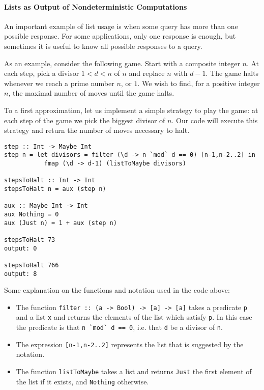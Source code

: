 \documentclass[11pt]{article}
\theoremstyle{nonumberplain}
\newcommand*\lsin{\lstinline}
\begin{document}
\paragraph{Lists as Output of Nondeterministic Computations}

An important example of list usage is when some query has more than one possible response. For some applications, only one response is enough, but sometimes it is useful to know all possible responses to a query.

As an example, consider the following game. Start with a composite integer $n$. At each step, pick a divisor $1 < d < n$ of $n$ and replace $n$ with $d-1$. The game halts whenever we reach a prime number $n$, or $1$. We wish to find, for a positive integer $n$, the maximal number of moves until the game halts.

To a first approximation, let us implement a simple strategy to play the game: at each step of the game we pick the biggest divisor of $n$. Our code will execute this strategy and return the number of moves necessary to halt.
\begin{lstlisting}
step :: Int -> Maybe Int
step n = let divisors = filter (\d -> n `mod` d == 0) [n-1,n-2..2] in
           fmap (\d -> d-1) (listToMaybe divisors)

stepsToHalt :: Int -> Int
stepsToHalt n = aux (step n)

aux :: Maybe Int -> Int
aux Nothing = 0
aux (Just n) = 1 + aux (step n)

stepsToHalt 73
output: 0

stepsToHalt 766
output: 8
\end{lstlisting}

Some explanation on the functions and notation used in the code above:
\begin{itemize}
\item The function \lsin|filter :: (a -> Bool) -> [a] -> [a]| takes a predicate \lsin|p| and a list \lsin|x| and returns the elements of the list which satisfy \lsin|p|. In this case the predicate is that \lsin|n `mod` d == 0|, i.e. that \lsin|d| be a divisor of \lsin|n|.

\item The expression \lsin|[n-1,n-2..2]| represents the list that is suggested by the notation.

\item The function \lsin|listToMaybe| takes a list and returns \lsin|Just| the first element of the list if it exists, and \lsin|Nothing| otherwise.
\end{itemize}
\end{document}

